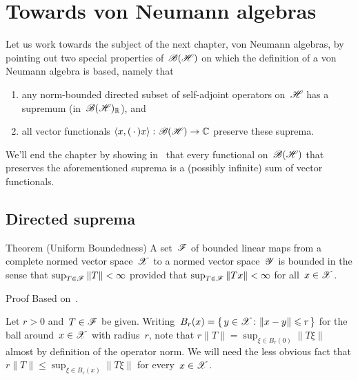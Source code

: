 \documentclass[a]{subfiles}
\begin{document}
\section{Towards von Neumann algebras}
\begin{parsec}%
\begin{point}%
Let us work towards
the subject of the next chapter, von Neumann algebras,
by pointing out two special properties
of~$\mathscr{B}(\mathscr{H})$
on which the definition of a von Neumann algebra is based,
namely that
\begin{enumerate}
\item
any norm-bounded directed subset of
self-adjoint operators on~$\mathscr{H}$
has a supremum (in~$\mathscr{B}(\mathscr{H})_{\mathbb{R}}$), and
\item
all vector functionals
$\left<x,(\,\cdot\,)x\right>\colon \mathscr{B}(\mathscr{H})\to\mathbb{C}$ 
preserve these suprema.
\end{enumerate}
We'll end
the chapter
by showing
in~
 that every  functional on~$\mathscr{B}(\mathscr{H})$
that  preserves the aforementioned
suprema
is a (possibly infinite) sum of vector functionals.
\end{point}

\subsection{Directed suprema}
\begin{point}[pub]{Theorem (Uniform Boundedness)}%
%
%
A set~$\mathscr{F}$ of bounded linear maps 
from a complete normed vector space~$\mathscr{X}$
to a normed vector space~$\mathscr{Y}$
is bounded
in the sense that $\sup_{T\in \mathscr{F}} \|T\|<\infty$
provided that 
 $\sup_{T\in \mathscr{F}} \|Tx\|<\infty$
 for all~$x\in \mathscr{X}$.
\begin{point}{Proof}%
Based on~\cite{sokal}.
\begin{point}%
Let $r>0$ and~$T\in\mathscr{F}$ be given.
Writing~$B_r(x)=\{\,y\in\mathscr{X}\colon \|x-y\|\leqslant r\,\}$
for the ball around~$x\in\mathscr{X}$ with radius~$r$,
note that $r\|T\|=\sup_{\xi\in B_r(0)} \|T \xi\|$
almost by definition of the operator norm.
We will need the less obvious fact
that $r\|T\|\leq \sup_{\xi \in B_r(x)}\|T \xi\|$
for every~$x\in \mathscr{X}$.


\end{point}
\end{point}
\end{point}
\end{parsec}
\end{document}

